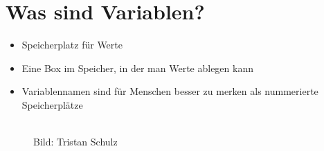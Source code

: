



\subtitle{Kapitel 3: Daten Zwischenspeichern}
\maketitle

\section{Was sind Variablen?}
\begin{frame}[fragile]
    \slidehead
    \begin{itemize}[<+->]
        \item Speicherplatz für Werte
        \item Eine Box im Speicher, in der man Werte ablegen kann
        \item Variablennamen sind für Menschen besser zu merken als nummerierte Speicherplätze
    \end{itemize}
\end{frame}

\begin{frame}[fragile]
    \slidehead
    \begin{figure}
        \centering
        \\	\sffamily \tiny Bild: Tristan Schulz
    \end{figure}
\end{frame}

